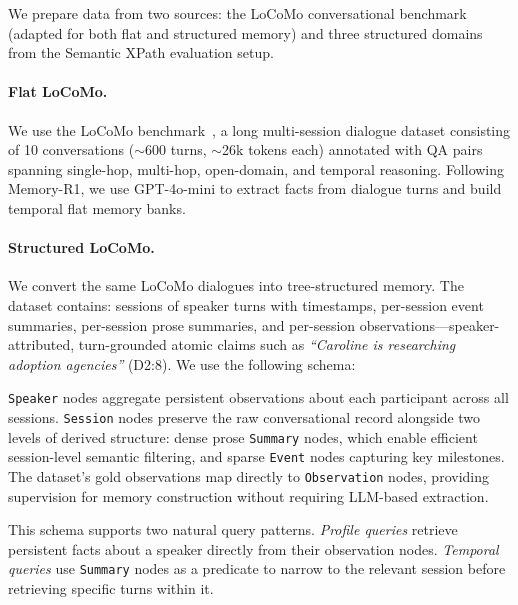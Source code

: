 \documentclass{article}
\theoremstyle{definition}
\begin{document}
We prepare data from two sources: the LoCoMo conversational benchmark (adapted for both flat and structured memory) and three structured domains from the Semantic XPath evaluation setup.

\paragraph{Flat LoCoMo.}
We use the LoCoMo benchmark~\citep{maharana2024evaluating}, a long multi-session dialogue dataset consisting of 10 conversations ($\sim$600 turns, $\sim$26k tokens each) annotated with QA pairs spanning single-hop, multi-hop, open-domain, and temporal reasoning. Following Memory-R1, we use GPT-4o-mini to extract facts from dialogue turns and build temporal flat memory banks.

\paragraph{Structured LoCoMo.}
We convert the same LoCoMo dialogues into tree-structured memory.
The dataset contains: sessions of speaker turns with timestamps, per-session event summaries, per-session prose summaries, and per-session observations---speaker-attributed, turn-grounded atomic claims such as \textit{``Caroline is researching adoption agencies''} (D2:8). We use the following schema:


\texttt{Speaker} nodes aggregate persistent observations about each participant across all sessions. \texttt{Session} nodes preserve the raw conversational record alongside two levels of derived structure: dense prose \texttt{Summary} nodes, which enable efficient session-level semantic filtering, and sparse \texttt{Event} nodes capturing key milestones. The dataset's gold observations map directly to \texttt{Observation} nodes, providing supervision for memory construction without requiring LLM-based extraction.

This schema supports two natural query patterns. \textit{Profile queries} retrieve persistent facts about a speaker directly from their observation nodes. \textit{Temporal queries} use \texttt{Summary} nodes as a predicate to narrow to the relevant session before retrieving specific turns within it.
\end{document}
